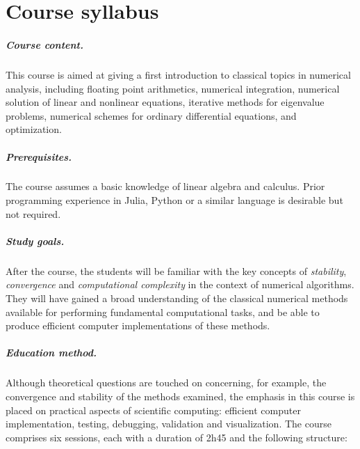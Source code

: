 \chapter*{Course syllabus}%

\paragraph{Course content.}%
This course is aimed at giving a first introduction to classical topics in numerical analysis,
including floating point arithmetics,
numerical integration,
numerical solution of linear and nonlinear equations,
iterative methods for eigenvalue problems,
numerical schemes for ordinary differential equations,
and optimization.

\paragraph{Prerequisites.}%
The course assumes a basic knowledge of linear algebra and calculus.
Prior programming experience in Julia, Python or a similar language is desirable but not required.

\paragraph{Study goals.}%
After the course,
the students will be familiar with the key concepts of \emph{stability}, \emph{convergence} and \emph{computational complexity} in the context of numerical algorithms.
They will have gained a broad understanding of the classical numerical methods available for performing fundamental computational tasks,
and be able to produce efficient computer implementations of these methods.

\paragraph{Education method.}%
Although theoretical questions are touched on concerning, for example, the convergence and stability of the methods examined,
the emphasis in this course is placed on practical aspects of scientific computing:
efficient computer implementation, testing, debugging, validation and visualization.
The course comprises six sessions, each with a duration of 2h45 and the following structure:

